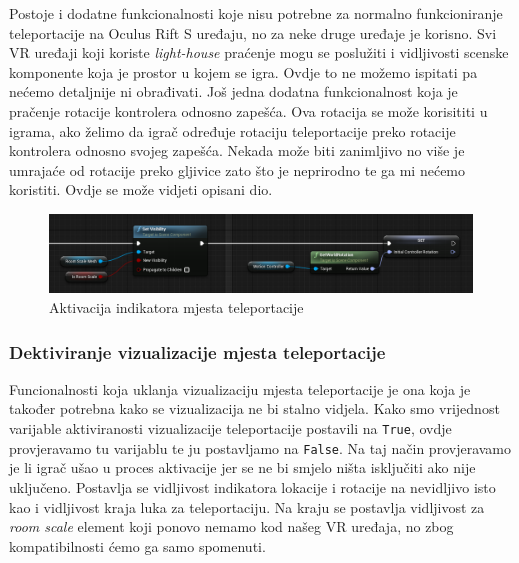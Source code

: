 \documentclass[a4paper,10pt]{article}
\begin{document}
Postoje i dodatne funkcionalnosti koje nisu potrebne za normalno funkcioniranje
teleportacije na Oculus Rift S uređaju, no za neke druge uređaje je korisno. Svi
VR uređaji koji koriste \textit{light-house} praćenje mogu se poslužiti i vidljivosti
scenske komponente koja je prostor u kojem se igra. Ovdje to ne možemo ispitati
pa nećemo detaljnije ni obrađivati. Još jedna dodatna funkcionalnost koja je
pračenje rotacije kontrolera odnosno zapešća. Ova rotacija se može korisititi u
igrama, ako želimo da igrač određuje rotaciju teleportacije preko rotacije
kontrolera odnosno svojeg zapešća. Nekada može biti zanimljivo no više je
umrajaće od rotacije preko gljivice zato što je neprirodno te ga mi nećemo
koristiti. Ovdje se može vidjeti opisani dio.

\begin{figure}[!h]
	\centering
	\includegraphics[width=\textwidth]{slike/13.png}
	\caption{Aktivacija indikatora mjesta teleportacije}
\end{figure}


\subsubsection{Dektiviranje vizualizacije mjesta teleportacije}


Funcionalnosti koja uklanja vizualizaciju mjesta teleportacije je ona koja je
također potrebna kako se vizualizacija ne bi stalno vidjela. Kako smo
vrijednost varijable aktiviranosti vizualizacije teleportacije postavili na
\texttt{True}, ovdje provjeravamo tu varijablu te ju postavljamo na
\texttt{False}.  Na taj način provjeravamo je li igrač ušao u proces aktivacije
jer se ne bi smjelo ništa isključiti ako nije uključeno.  Postavlja se
vidljivost indikatora lokacije i rotacije na nevidljivo isto kao i vidljivost
kraja luka za teleportaciju. Na kraju se postavlja vidljivost za \textit{room
scale} element koji ponovo nemamo kod našeg VR uređaja, no zbog kompatibilnosti
ćemo ga samo spomenuti.
\end{document}
